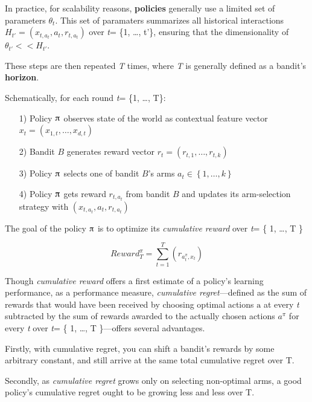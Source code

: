 \documentclass{jss}\usepackage[]{graphicx}\usepackage[]{color}
\begin{document}
In practice, for scalability reasons, \textbf{policies} generally use a limited set of parameters $\theta_{t}$. This set of paramaters summarizes all historical interactions \( H_{t'} = (x_{t,a_t},a_{t},r_{t,a_t}) \) over \emph{t}= \{1, \ldots, t'\}, ensuring that the dimensionality of $\theta_{t'} << H_{t'}$.

These steps are then repeated \textit{T} times, where \textit{T} is generally defined as a bandit's \textbf{horizon}.

Schematically, for each round \emph{t}= \{1, \ldots, T\}:

\begin{enumerate}
         \item[1)] Policy $\piup$ observes state of the world as contextual feature vector \(x_{t}=\left( x_{1,t},  \dots, x_{d,t}\right)\)
         \item[2)] Bandit $B$ generates reward vector \(r_{t}=\left( r_{t,1},  \dots, r_{t,k}\right)\)
         \item[3)] Policy $\piup$ selects one of bandit $B$'s arms \(a_{t} \in \left\{ 1, \dots, k \right\}\)
         \item[4)] Policy $\piup$ gets reward \(r_{t,a_t}\) from bandit $B$ and updates its arm-selection strategy with \( (x_{t,a_t},a_{t},r_{t,a_t}) \)
\end{enumerate}

The goal of the policy $\piup$ is to optimize its \textit{cumulative reward} over \emph{t}= \{ 1, \ldots, T \}

\begin{equation} \label{eq:1}
Reward^{\pi}_{T} = \sum^{T}_{t=1}(r_{a^{\pi}_t,x_t})
\end{equation}

Though \textit{cumulative reward} offers a first estimate of a policy's learning performance, as a performance measure, \textit{cumulative regret}---defined as the sum of rewards that would have been received by choosing optimal actions $\mathrm{a}$ at every \emph{t} subtracted by the sum of rewards awarded to the actually chosen actions $a^{\pi}$ for every \emph{t} over \emph{t}= \{ 1, \ldots, T \}---offers several advantages.

Firstly, with cumulative regret, you can shift a bandit's rewards by some arbitrary constant, and still arrive at the same total cumulative regret over T.

Secondly, as \textit{cumulative regret} grows only on selecting non-optimal arms, a good policy's cumulative regret ought to be growing less and less over T.
\end{document}

